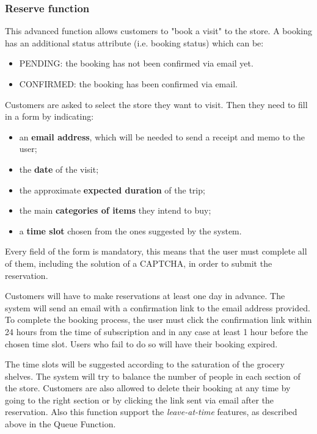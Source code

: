 	\subsubsection{Reserve function}
	This advanced function allows customers to "book a visit" to the store.
	A booking has an additional status attribute (i.e. booking status) which can be:
	\begin{itemize}
		\item PENDING: the booking has not been confirmed via email yet.
		\item CONFIRMED: the booking has been confirmed via email.
	\end{itemize}

	Customers are asked to select the store they want to visit. Then they need to fill in a form by indicating:
	\begin{itemize}
		\item an \textbf{email address}, which will be needed to send a receipt and memo to the user;
		\item the \textbf{date} of the visit;
		\item the approximate \textbf{expected duration} of the trip;
	 	\item the main \textbf{categories of items} they intend to buy;
	    \item a \textbf{time slot} chosen from the ones suggested by the system.
	\end{itemize}
	Every field of the form is mandatory, this means that the user must complete all of them, including the solution of a CAPTCHA, in order to submit the reservation.

	Customers will have to make reservations at least one day in advance.\newline
	The system will send an email with a confirmation link to the email address provided. To complete the booking process, the user must click the confirmation link within 24 hours from the time of subscription and in any case at least 1 hour before the chosen time slot. Users who fail to do so will have their booking expired.

	The time slots will be suggested according to the saturation of the grocery shelves. The system will try to balance the number of people in each section of the store.\newline
	Customers are also allowed to delete their booking at any time by going to the right section or by clicking the link sent via email after the reservation.
	Also this function support the \textit{leave-at-time} features, as described above in the Queue Function.

